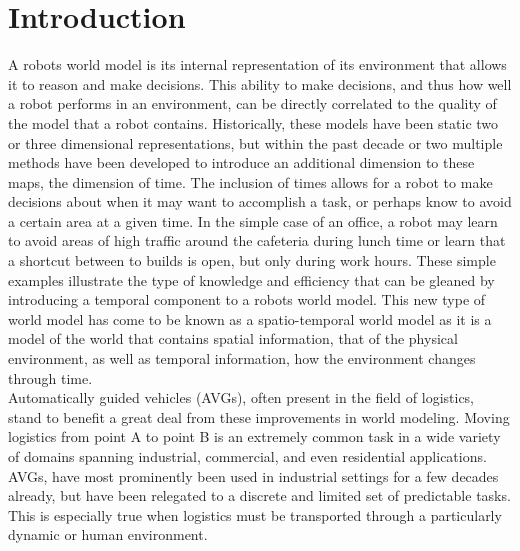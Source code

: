 

  \chapter{ Introduction }

  A robots world model is its internal representation of its environment that
  allows it to reason and make decisions. This ability to make decisions, and
  thus how well a robot performs in an environment, can be directly correlated
  to the quality of the model that a robot contains.  Historically, these models
  have been static two or three dimensional representations, but within the past
  decade or two multiple methods have been developed to introduce an additional
  dimension to these maps, the dimension of time. The inclusion of times allows
  for a robot to make decisions about when it may want to accomplish a task, or
  perhaps know to avoid a certain area at a given time. In the simple case of an
  office, a robot may learn to avoid areas of high traffic around the cafeteria
  during lunch time or learn that a shortcut between to builds is open, but only
  during work hours. These simple examples illustrate the type of knowledge and
  efficiency that can be gleaned by introducing a temporal component to a robots
  world model. This new type of world model has come to be known as a
  spatio-temporal world model as it is a model of the world that contains
  spatial information, that of the physical environment, as well as temporal
  information, how the environment changes through time.\\

  Automatically guided vehicles (AVGs), often present in the field of logistics,
  stand to benefit a great deal from these improvements in world modeling.
  Moving logistics from point A to point B is an extremely common task in a wide
  variety of domains spanning industrial, commercial, and even residential
  applications. AVGs, have most prominently been used in industrial settings for
  a few decades already, but have been relegated to a discrete and limited set
  of predictable tasks. This is especially true when logistics must be
  transported through a particularly dynamic or human environment.\\

